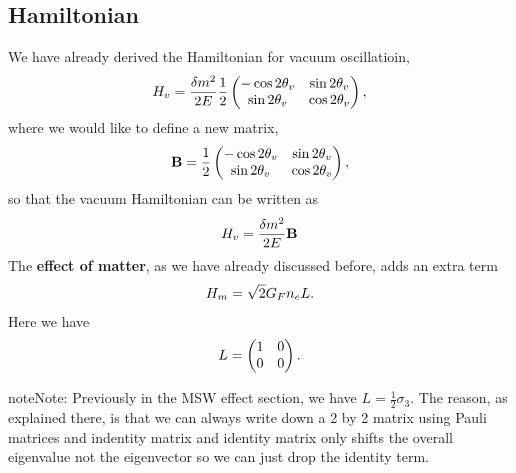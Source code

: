 \documentclass[letterpaper,12pt,english]{sphinxmanual}
\begin{document}
\subsection{Hamiltonian}
\label{oscillations:id3}
We have already derived the Hamiltonian for vacuum oscillatioin,
\begin{gather}
\begin{split}H_v=\frac{ \delta m^2 }{2E}\frac{1}{2}\begin{pmatrix} -\cos 2\theta_v & \sin 2 \theta_v \\ \sin 2\theta_v & \cos 2\theta_v  \end{pmatrix},\end{split}\notag
\end{gather}
where we would like to define a new matrix,
\begin{gather}
\begin{split}\mathbf B = \frac{1}{2}\begin{pmatrix}  -\cos 2\theta_v & \sin 2 \theta_v \\ \sin 2\theta_v & \cos 2\theta_v  \end{pmatrix},\end{split}\notag
\end{gather}
so that the vacuum Hamiltonian can be written as
\begin{gather}
\begin{split}H_v = \frac{ \delta m^2 }{2E}\mathbf B\end{split}\notag
\end{gather}
The \textbf{effect of matter}, as we have already discussed before, adds an extra term
\begin{gather}
\begin{split}H_m = \sqrt{2}G_F n_e L.\end{split}\notag
\end{gather}
Here we have
\begin{gather}
\begin{split}L = \begin{pmatrix} 1 & 0 \\ 0 & 0 \end{pmatrix}.\end{split}\notag
\end{gather}
\begin{notice}{note}{Note:}
Previously in the MSW effect section, we have \(L=\frac{1}{2}\sigma_3\). The reason, as explained there, is that we can always write down a 2 by 2 matrix using Pauli matrices and indentity matrix and identity matrix only shifts the overall eigenvalue not the eigenvector so we can just drop the identity term.
\end{notice}
\end{document}
